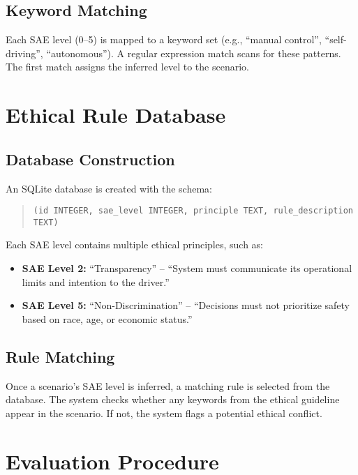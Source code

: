 \subsection{Keyword Matching}

Each SAE level (0--5) is mapped to a keyword set (e.g., ``manual control'', ``self-driving'', ``autonomous''). A regular expression match scans for these patterns. The first match assigns the inferred level to the scenario.

\section{Ethical Rule Database}

\subsection{Database Construction}

An SQLite database is created with the schema:

\begin{quote}
\texttt{(id INTEGER, sae\_level INTEGER, principle TEXT, rule\_description TEXT)}
\end{quote}

Each SAE level contains multiple ethical principles, such as:

\begin{itemize}
    \item \textbf{SAE Level 2:} ``Transparency'' – ``System must communicate its operational limits and intention to the driver.''
    \item \textbf{SAE Level 5:} ``Non-Discrimination'' – ``Decisions must not prioritize safety based on race, age, or economic status.''
\end{itemize}

\subsection{Rule Matching}

Once a scenario's SAE level is inferred, a matching rule is selected from the database. The system checks whether any keywords from the ethical guideline appear in the scenario. If not, the system flags a potential ethical conflict.

\section{Evaluation Procedure}

